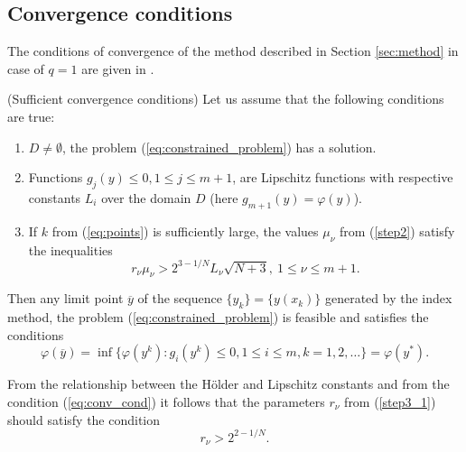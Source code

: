 \documentclass[runningheads]{llncs}
\begin{document}
\subsection{Convergence conditions }
\label{sec:conv_method}

The conditions of convergence of the method described in Section \ref{sec:method} in case of \(q=1\) are given in \cite{Strongin2000}.
\begin{theorem} (Sufficient convergence conditions)
  \label{th:single_conv}
  Let us assume that the following conditions are true:
  \begin{enumerate}
    \item \(D\ne\emptyset\), the problem (\ref{eq:constrained_problem}) has a solution.
    \item Functions \(g_j(y)\leqslant 0, 1\leqslant j\leqslant m + 1\), are Lipschitz functions with
respective constants \(L_i\) over the domain \(D\) (here \(g_{m+1}(y)=\varphi(y)\)).
    \item If \(k\) from (\ref{eq:points}) is sufficiently large,
    the values \(\mu_\nu\) from (\ref{step2}) satisfy the inequalities
    \begin{equation}
      r_\nu\mu_\nu > 2^{3-1/N}L_\nu \sqrt{N+3},\: 1\leqslant \nu \leqslant m + 1.
    \end{equation}
  \end{enumerate}
  Then any limit point \(\overline{y}\) of the sequence \(\{y_k\} = \{y(x_k)\}\) generated
  by the index method, the problem
  (\ref{eq:constrained_problem}) is feasible and satisfies the conditions
\begin{equation}
  \label{eq:conv_cond}
  \varphi(\overline{y})=\inf\{ \varphi(y^k): g_i(y^k)\leqslant 0,1\leqslant i\leqslant m, k=1,2,\dots\}=\varphi(y^*).
\end{equation}
\end{theorem}

\begin{remark}
  \label{rem:r1}
  From the relationship between the H\"{o}lder and Lipschitz constants and from the condition (\ref{eq:conv_cond}) it follows
  that the parameters \(r_\nu\) from (\ref{step3_1}) should satisfy the condition
  \begin{equation}
    r_\nu > 2^{2 - 1/N}.
  \end{equation}
\end{remark}
\end{document}
